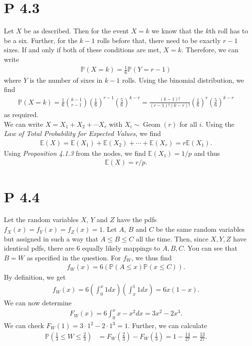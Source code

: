 \documentclass{article}
\renewcommand{\P}{\mathbb{P}}
\newcommand{\E}{\mathbb{E}}
\DeclareMathOperator{\Geom}{Geom}
\begin{document}
\section*{P 4.3}
Let $X$ be as described. Then for the event $X=k$ we know that
the $k$th roll has to be a six. Further, for the $k-1$ rolls before
that, there need to be exactly $r-1$ sixes. If and only if both of these
conditions are met, $X=k$. Therefore, we can write
\begin{align*}
  \P(X=k) = \frac{1}{6}\P(Y=r-1)
\end{align*}
where $Y$ is the number of sixes in $k-1$ rolls. Using the binomial
distribution, we find
\begin{align*}
  \P(X=k) = \frac{1}{6}\binom{k-1}{r-1}\left(\frac{1}{6}\right)^ {r-1}
  \left(\frac{5}{6}\right)^{k-r}
  = \frac{(k-1)!}{(r-1)!(k-r)!}\left(\frac{1}{6}\right)^r\left(\frac{5}{6}\right)^{k-r}
\end{align*}
as required. \\
We can write $X=X_1+X_2+\cdots X_r$ with $X_i\sim \Geom(r)$ for all $i$. 
Using the \emph{Law of Total Probability for Expected Values}, we find
\begin{align*}
  \E(X) = \E(X_1) + \E(X_2) + \cdots + \E(X_r) = r\E(X_1).
\end{align*}
Using \emph{Proposition 4.1.3} from the nodes, we find $\E(X_1) = 1/p$ and thus
\begin{align*}
  \E(X) = r/p.
\end{align*}
\section*{P 4.4}
Let the random variables $X$, $Y$ and $Z$ have 
the pdfs $f_X(x)=f_Y(x)=f_Z(x)=1$. Let $A$, $B$ and $C$
be the same random variables but assigned in such a way that
$A\leq B\leq C$ all the time. Then, since $X,Y,Z$ have identical pdfs,
there are $6$ equally likely mappings to $A,B,C$.
You can see that $B=W$ as specified in the question. For $f_W$, 
we thus find
\begin{align*}
  f_W(x) = 6\left(\P(A \leq x)\P(x \leq C)\right).
\end{align*}
By definition, we get
\begin{align*}
  f_W(x) = 6\left(\int_0^x 1dx\right)\left(\int_x^1 1dx\right) = 6x(1-x).
\end{align*}
We can now determine
\begin{align*}
  F_W(x) = 6\int_0^x x - x^2 dx = 3x^2-2x^3.
\end{align*}
We can check $F_W(1) = 3\cdot 1^2 - 2 \cdot 1^3 = 1$. Further, we can
calculate
\begin{align*}
  \P\left(\frac{1}{3}\leq W \leq \frac{2}{3}\right)
  &= F_W\left(\frac{2}{3}\right) - F_W\left(\frac{1}{3}\right)
  = 1 - \frac{14}{27} = \frac{13}{27}.
\end{align*}
\end{document}

